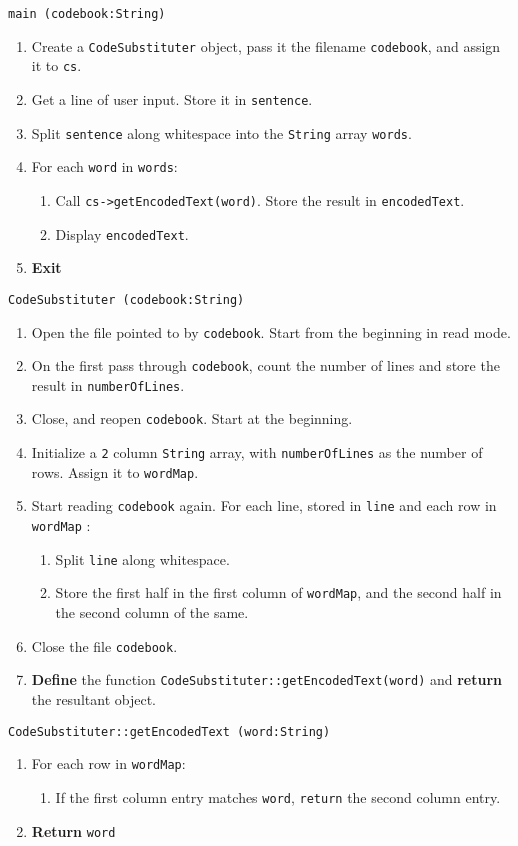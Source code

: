 \algorithm
\texttt{main (codebook:String)}
\begin{enumerate}
	\item Create a \texttt{CodeSubstituter} object, pass it the filename \texttt{codebook}, and assign it
		to \texttt{cs}.
	\item Get a line of user input. Store it in \texttt{sentence}.
	\item Split \texttt{sentence} along whitespace into the \texttt{String} array \texttt{words}.
	\item For each \texttt{word} in \texttt{words}:
	\begin{enumerate}
		\item Call \texttt{cs->getEncodedText(word)}. Store the result in \texttt{encodedText}.
		\item Display \texttt{encodedText}. 
	\end{enumerate}
	\item \textbf{Exit} 
\end{enumerate}
\vspace{8mm}
\texttt{CodeSubstituter (codebook:String)}
\begin{enumerate}
	\item Open the file pointed to by \texttt{codebook}. Start from the beginning in read mode.
	\item On the first pass through \texttt{codebook}, count the number of lines and store the result in \texttt{numberOfLines}.
	\item Close, and reopen \texttt{codebook}. Start at the beginning.
	\item Initialize a \texttt{2} column \texttt{String} array, with \texttt{numberOfLines} as the number of rows. Assign it
		to \texttt{wordMap}. 
	\item Start reading \texttt{codebook} again. For each line, stored in \texttt{line} and each row in \texttt{wordMap} :
	\begin{enumerate}
		\item Split \texttt{line} along whitespace.
		\item Store the first half in the first column of \texttt{wordMap}, and the second half in the second column
			of the same.
	\end{enumerate}
	\item Close the file \texttt{codebook}.
	\item \textbf{Define} the function \texttt{CodeSubstituter::getEncodedText(word)} and \textbf{return} the resultant object.
\end{enumerate}
\vspace{5mm}
\texttt{CodeSubstituter::getEncodedText (word:String)}
\begin{enumerate}
	\item For each row in \texttt{wordMap}:
	\begin{enumerate}
		\item If the first column entry matches \texttt{word}, \texttt{return} the second column entry. 
	\end{enumerate}
	\item \textbf{Return} \texttt{word} 
\end{enumerate}

